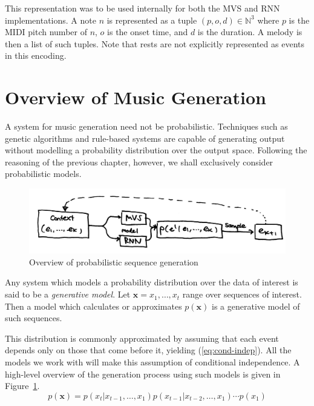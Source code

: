 \documentclass[12pt,a4paper,twoside,openright]{report}
\newcommand{\vect}[1]{\boldsymbol{\mathbf{#1}}}
\begin{document}
This representation was to be used internally for both the MVS and
RNN implementations. A note $n$ is represented as a tuple $(p,o,d) \in
\mathbb{N}^3$ where $p$ is the MIDI pitch number of $n$, $o$ is the onset 
time, and $d$ is the duration. A melody is then a list of such tuples. Note that
rests are not explicitly represented as events in this encoding.

\section{Overview of Music Generation}\label{sec:gen-models}

A system for music generation need not be probabilistic. Techniques such as
genetic algorithms and rule-based systems are capable of generating output
without modelling a probability distribution over the output space. Following
the reasoning of the previous chapter, however, we shall exclusively consider
probabilistic models. 

\begin{figure}[H]
\centering
\includegraphics[width=400pt]{figs/high_level_tmp.jpg}
\caption{Overview of probabilistic sequence generation}
\label{fig:seq-gen-overview}
\end{figure}

Any system which models a probability distribution over the data of interest is
said to be a \emph{generative model}. Let $\vect{x} = x_1, \ldots, x_t$ range
over sequences of interest. Then a model which calculates or approximates
$p(\vect{x})$ is a generative model of such sequences.

This distribution is commonly approximated by assuming that each event 
depends only on those that come before it, yielding (\ref{eq:cond-indep}). All the
models we work with will make this assumption of conditional independence. A
high-level overview of the generation process using such models is given in
Figure~\ref{fig:seq-gen-overview}.
\begin{equation}
  p(\vect{x}) = p(x_t | x_{t-1}, \ldots, x_1) p(x_{t-1} | x_{t-2},
  \ldots, x_1) \cdots p(x_1) \label{eq:cond-indep}
\end{equation} 
\end{document}
